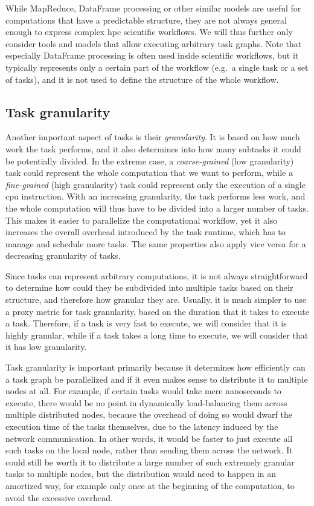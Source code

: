 While MapReduce, DataFrame processing or other similar models are useful for computations that have
a predictable structure, they are not always general enough to express complex
\gls{hpc} scientific workflows. We will thus further only consider tools and models
that allow executing arbitrary task graphs. Note that especially DataFrame processing is often used
inside scientific workflows, but it typically represents only a certain part of the workflow (e.g.\
a single task or a set of tasks), and it is not used to define the structure of the whole workflow.

\subsection{Task granularity}
\label{sec:task-granularity}
Another important aspect of tasks is their \emph{granularity}. It is based on how much work
the task performs, and it also determines into how many subtasks it could be potentially divided.
In the extreme case, a \emph{coarse-grained} (low granularity) task could represent the whole computation that we
want to perform, while a \emph{fine-grained} (high granularity) task could represent only the execution of a
single \gls{cpu} instruction. With an increasing granularity, the task performs less
work, and the whole computation will thus have to be divided into a larger number of tasks. This
makes it easier to parallelize the computational workflow, yet it also increases the overall
overhead introduced by the task runtime, which has to manage and schedule more tasks. The same
properties also apply vice versa for a decreasing granularity of tasks.

Since tasks can represent arbitrary computations, it is not always straightforward to determine how
could they be subdivided into multiple tasks based on their structure, and therefore how granular
they are. Usually, it is much simpler to use a proxy metric for task granularity, based on the
duration that it takes to execute a task. Therefore, if a task is very fast to execute, we will
consider that it is highly granular, while if a task takes a long time to execute, we will consider
that it has low granularity.

Task granularity is important primarily because it determines how efficiently can a task graph be
parallelized and if it even makes sense to distribute it to multiple nodes at all. For example, if
certain tasks would take mere nanoseconds to execute, there would be no point in dynamically
load-balancing them across multiple distributed nodes, because the overhead of doing so would dwarf
the execution time of the tasks themselves, due to the latency induced by the network
communication. In other words, it would be faster to just execute all such tasks on the local node,
rather than sending them across the network. It could still be worth it to distribute a large
number of such extremely granular tasks to multiple nodes, but the distribution would need to
happen in an amortized way, for example only once at the beginning of the computation, to avoid the
excessive overhead.

